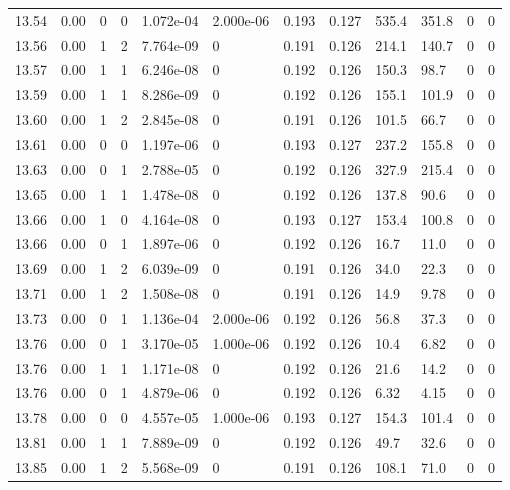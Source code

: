 \documentclass[preview]{standalone}
\begin{document}
{{{{{{{{{{\begin{tabular}{L{1.2cm}C{1.2cm} C{0.3cm}C{0.5cm} C{1.4cm}C{1.4cm} C{1.4cm}C{1.4cm} C{1.6cm}C{1.6cm} C{1.6cm}C{1.6cm}}
  13.54  &  0.00  & 0     &  0 &  1.072e-04  & 2.000e-06  &  0.193&   0.127& 535.4 & 351.8   &  0 & 0  \\ 
  13.56  &  0.00  & 1     &  2 &  7.764e-09  & 0  &  0.191&   0.126& 214.1 & 140.7   &  0 & 0  \\ 
  13.57  &  0.00  & 1     &  1 &  6.246e-08  & 0  &  0.192&   0.126& 150.3 & 98.7   &  0 & 0  \\ 
  13.59  &  0.00  & 1     &  1 &  8.286e-09  & 0  &  0.192&   0.126& 155.1 & 101.9   &  0 & 0  \\ 
  13.60  &  0.00  & 1     &  2 &  2.845e-08  & 0  &  0.191&   0.126& 101.5 & 66.7   &  0 & 0  \\ 
  13.61  &  0.00  & 0     &  0 &  1.197e-06  & 0  &  0.193&   0.127& 237.2 & 155.8   &  0 & 0  \\ 
  13.63  &  0.00  & 0     &  1 &  2.788e-05  & 0  &  0.192&   0.126& 327.9 & 215.4   &  0 & 0  \\ 
  13.65  &  0.00  & 1     &  1 &  1.478e-08  & 0  &  0.192&   0.126& 137.8 & 90.6   &  0 & 0  \\ 
  13.66  &  0.00  & 1     &  0 &  4.164e-08  & 0  &  0.193&   0.127& 153.4 & 100.8   &  0 & 0  \\ 
  13.66  &  0.00  & 0     &  1 &  1.897e-06  & 0  &  0.192&   0.126& 16.7 & 11.0   &  0 & 0  \\ 
  13.69  &  0.00  & 1     &  2 &  6.039e-09  & 0  &  0.191&   0.126& 34.0 & 22.3   &  0 & 0  \\ 
  13.71  &  0.00  & 1     &  2 &  1.508e-08  & 0  &  0.191&   0.126& 14.9 & 9.78   &  0 & 0  \\ 
  13.73  &  0.00  & 0     &  1 &  1.136e-04  & 2.000e-06  &  0.192&   0.126& 56.8 & 37.3   &  0 & 0  \\ 
  13.76  &  0.00  & 0     &  1 &  3.170e-05  & 1.000e-06  &  0.192&   0.126& 10.4 & 6.82   &  0 & 0  \\ 
  13.76  &  0.00  & 1     &  1 &  1.171e-08  & 0  &  0.192&   0.126& 21.6 & 14.2   &  0 & 0  \\ 
  13.76  &  0.00  & 0     &  1 &  4.879e-06  & 0  &  0.192&   0.126& 6.32 & 4.15   &  0 & 0  \\ 
  13.78  &  0.00  & 0     &  0 &  4.557e-05  & 1.000e-06  &  0.193&   0.127& 154.3 & 101.4   &  0 & 0  \\ 
  13.81  &  0.00  & 1     &  1 &  7.889e-09  & 0  &  0.192&   0.126& 49.7 & 32.6   &  0 & 0  \\ 
  13.85  &  0.00  & 1     &  2 &  5.568e-09  & 0  &  0.191&   0.126& 108.1 & 71.0   &  0 & 0  \\ 

\end{tabular}}}}}}}}}}}
\end{document}

